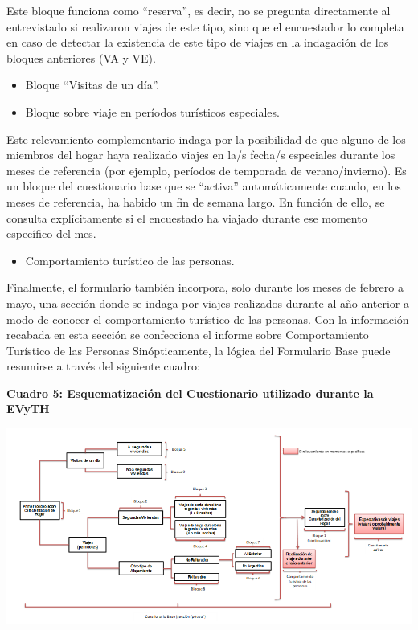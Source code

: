 \documentclass[
  openany]{book}
\providecommand{\tightlist}{%
  \setlength{\itemsep}{0pt}\setlength{\parskip}{0pt}}
\begin{document}
Este bloque funciona como ``reserva'', es decir, no se pregunta directamente al entrevistado si realizaron viajes de este tipo, sino que el encuestador lo completa en caso de detectar la existencia de este tipo de viajes en la indagación de los bloques anteriores (VA y VE).

\begin{itemize}
\item
  Bloque ``Visitas de un día''.
\item
  Bloque sobre viaje en períodos turísticos especiales.
\end{itemize}

Este relevamiento complementario indaga por la posibilidad de que alguno de los miembros del hogar haya realizado viajes en la/s fecha/s especiales durante los meses de referencia (por ejemplo, períodos de temporada de verano/invierno). Es un bloque del cuestionario base que se ``activa'' automáticamente cuando, en los meses de referencia, ha habido un fin de semana largo. En función de ello, se consulta explícitamente si el encuestado ha viajado durante ese momento específico del mes.

\begin{itemize}
\tightlist
\item
  Comportamiento turístico de las personas.
\end{itemize}

Finalmente, el formulario también incorpora, solo durante los meses de febrero a mayo, una sección donde se indaga por viajes realizados durante al año anterior a modo de conocer el comportamiento turístico de las personas.
Con la información recabada en esta sección se confecciona el informe sobre Comportamiento Turístico de las Personas Sinópticamente, la lógica del Formulario Base puede resumirse a través del siguiente cuadro:

\textbf{Cuadro 5: Esquematización del Cuestionario utilizado durante la EVyTH}

\includegraphics{cuadros_graficos/07_esquema_cuestionario.png}
\end{document}
